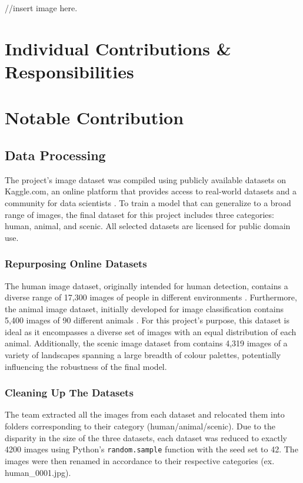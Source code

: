 \documentclass{article} %
\begin{document}
//insert image here. 

\section{Individual Contributions \& Responsibilities}

\section{Notable Contribution}

\subsection{Data Processing}

 The project's image dataset was compiled using publicly available datasets on Kaggle.com, an online platform that provides access to real-world datasets and a community for data scientists \citep[]{kaggle}. To train a model that can generalize to a broad range of images, the final dataset for this project includes three categories: human, animal, and scenic. All selected datasets are licensed for public domain use. 

 \subsubsection{Repurposing Online Datasets}

The human image dataset, originally intended for human detection, contains a diverse range of 17,300 images of people in different environments \citep[]{kaggle_human}. Furthermore, the animal image dataset, initially developed for image classification contains 5,400 images of 90 different animals \citep[]{kaggle_animal}. For this project’s purpose, this dataset is ideal as it encompasses a diverse set of images with an equal distribution of each animal. Additionally, the scenic image dataset from \citet{kaggle_scene} contains 4,319 images of a variety of landscapes spanning a large breadth of colour palettes, potentially influencing the robustness of the final model.

\subsubsection{Cleaning Up The Datasets}
The team extracted all the images from each dataset and relocated them into folders corresponding to their category (human/animal/scenic). Due to the disparity in the size of the three datasets, each dataset was reduced to exactly 4200 images using Python’s \verb|random.sample| function with the seed set to 42. The images were then renamed in accordance to their respective categories (ex. human\_0001.jpg). 
\end{document}
